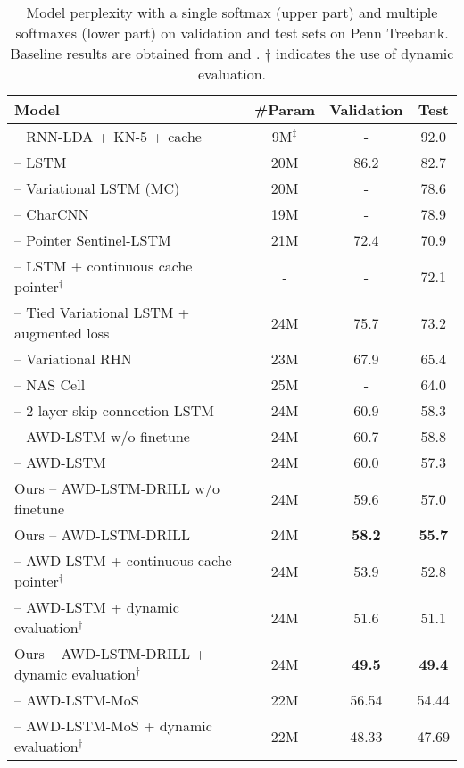 \documentclass{article}
\begin{document}
\begin{table*}[ht]\small
	\centering
	\begin{tabular}{l|ccc}
		\toprule
		\bf Model & \bf \#Param & \bf Validation &  \bf Test \\
		\midrule
		\citet{mikolov2012context} -- RNN-LDA + KN-5 + cache & 9M$^\ddagger$ & - & 92.0 \\
		\citet{zaremba2014recurrent} -- LSTM & 20M & 86.2 & 82.7 \\
		\citet{gal2016theoretically} -- Variational LSTM (MC) & 20M & - & 78.6 \\
		\citet{kim2016character} -- CharCNN & 19M & - & 78.9 \\
		\citet{merity2016pointer} -- Pointer Sentinel-LSTM & 21M & 72.4 & 70.9 \\
		\citet{grave2016improving} -- LSTM + continuous cache pointer$^\dagger$ & - & - & 72.1 \\
		\citet{inan2016tying} -- Tied Variational LSTM + augmented loss & 24M & 75.7 & 73.2 \\
		\citet{zilly2016recurrent} -- Variational RHN & 23M & 67.9 & 65.4 \\
		\citet{zoph2016neural} -- NAS Cell & 25M & - & 64.0 \\
		\citet{melis2017state} -- 2-layer skip connection LSTM & 24M & 60.9 & 58.3 \\
		\midrule
		\citet{merity2017regularizing} -- AWD-LSTM w/o finetune & 24M & 60.7 & 58.8 \\\citet{merity2017regularizing} -- AWD-LSTM & 24M & 60.0 & 57.3 \\
		Ours -- AWD-LSTM-DRILL w/o finetune & 24M & 59.6 & 57.0 \\Ours -- AWD-LSTM-DRILL  & 24M & \textbf{58.2} & \textbf{55.7} \\

		\midrule
	
		\citet{merity2017regularizing} -- AWD-LSTM + continuous cache pointer$^\dagger$ & 24M & 53.9 & 52.8 \\
		\citet{krause2017dynamic} -- AWD-LSTM + dynamic evaluation$^\dagger$ & 24M & 51.6 & 51.1 \\
		Ours -- AWD-LSTM-DRILL + dynamic evaluation$^\dagger$ & 24M & \textbf{49.5} & \textbf{49.4}  \\

		\midrule \midrule
		\citet{mos2018} -- AWD-LSTM-MoS & 22M & {56.54} & {54.44} \\
		\citet{mos2018} -- AWD-LSTM-MoS + dynamic evaluation$^\dagger$ & 22M & {48.33} & {47.69} \\
		\bottomrule
	\end{tabular}
	\vspace{-2mm}
	\caption{\small
		Model perplexity with a single softmax (upper part) and multiple softmaxes (lower part) on validation and test sets on Penn Treebank. Baseline results are obtained from \citet{merity2017regularizing} and \citet{krause2017dynamic}. $\dagger$ indicates the use of dynamic evaluation.
	}
		\vspace{-4mm}
	\label{table:PTB}
\end{table*} 
\end{document}
